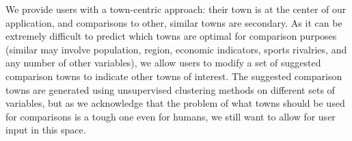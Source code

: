 \documentclass[10pt]{article}\usepackage[]{graphicx}\usepackage[]{color}
\begin{document}



We provide users with a town-centric approach: their town is at the center of our application, and comparisons to other, similar towns are secondary. As it can be extremely difficult to predict which towns are optimal for comparison purposes (similar may involve population, region, economic indicators, sports rivalries, and any number of other variables), we allow users to modify a set of suggested comparison towns to indicate other towns of interest. The suggested comparison towns are generated using unsupervised clustering methods on different sets of variables, but as we acknowledge that the problem of what towns should be used for comparisons is a tough one even for humans, we still want to allow for user input in this space. 
\end{document}
